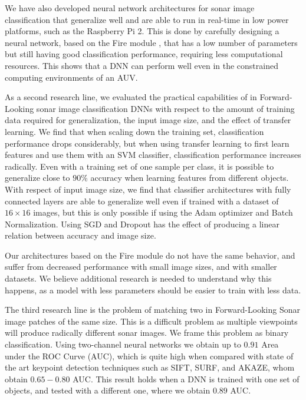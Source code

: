 We have also developed neural network architectures for sonar image classification that generalize well and are able to run in real-time in low power platforms, such as the Raspberry Pi 2. This is done by carefully designing a neural network, based on the Fire module \cite[-7em]{iandola2016squeezenet}, that has a low number of parameters but still having good classification performance, requiring less computational resources. This shows that a DNN can perform well even in the constrained computing environments of an AUV.

As a second research line, we evaluated the practical capabilities of in Forward-Looking sonar image classification DNNs with respect to the amount of training data required for generalization, the input image size, and the effect of transfer learning. We find that when scaling down the training set, classification performance drops considerably, but when using transfer learning to first learn features and use them with an SVM classifier, classification performance increases radically. Even with a training set of one sample per class, it is possible to generalize close to $90 \%$ accuracy when learning features from different objects.
With respect of input image size, we find that classifier architectures with fully connected layers are able to generalize well even if trained with a dataset of $16 \times 16$ images, but this is only possible if using the Adam optimizer and Batch Normalization. Using SGD and Dropout has the effect of producing a linear relation between accuracy and image size.

Our architectures based on the Fire module do not have the same behavior, and suffer from decreased performance with small image sizes, and with smaller datasets. We believe additional research is needed to understand why this happens, as a model with less parameters should be easier to train with less data.

The third research line is the problem of matching two in Forward-Looking Sonar image patches of the same size. This is a difficult problem as multiple viewpoints will produce radically different sonar images. We frame this problem as binary classification. Using two-channel neural networks we obtain up to $0.91$ Area under the ROC Curve (AUC), which is quite high when compared with state of the art keypoint detection techniques such as SIFT, SURF, and AKAZE, whom obtain $0.65-0.80$ AUC. This result holds when a DNN is trained with one set of objects, and tested with a different one, where we obtain $0.89$ AUC.

